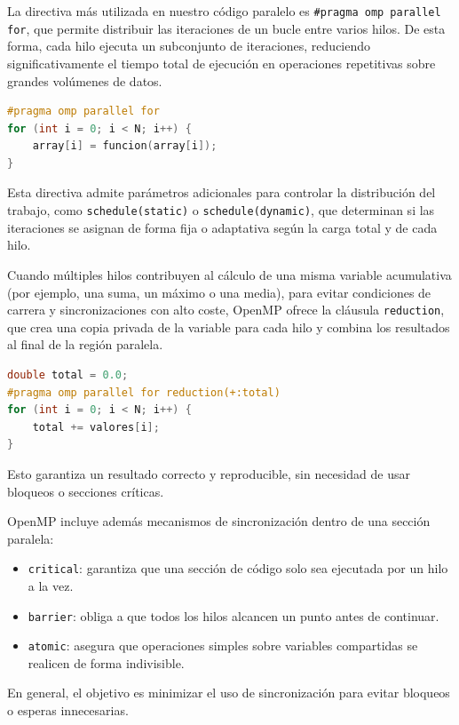 La directiva más utilizada en nuestro código paralelo es \texttt{\#pragma omp parallel for}, que permite distribuir las iteraciones de un bucle entre varios hilos.
De esta forma, cada hilo ejecuta un subconjunto de iteraciones, reduciendo significativamente el tiempo total de ejecución en operaciones repetitivas sobre grandes volúmenes de datos.

\begin{lstlisting}[language=C,label={lst:lstlisting2}]
#pragma omp parallel for
for (int i = 0; i < N; i++) {
    array[i] = funcion(array[i]);
}
\end{lstlisting}

Esta directiva admite parámetros adicionales para controlar la distribución del trabajo, como \texttt{schedule(static)} o \texttt{schedule(dynamic)}, que determinan si las iteraciones se asignan de forma fija o adaptativa según la carga total y de cada hilo.

Cuando múltiples hilos contribuyen al cálculo de una misma variable acumulativa (por ejemplo, una suma, un máximo o una media), para evitar condiciones de carrera y sincronizaciones con alto coste, OpenMP ofrece la cláusula \texttt{reduction}, que crea una copia privada de la variable para cada hilo y combina los resultados al final de la región paralela.

\begin{lstlisting}[language=C,label={lst:lstlisting}]
double total = 0.0;
#pragma omp parallel for reduction(+:total)
for (int i = 0; i < N; i++) {
    total += valores[i];
}
\end{lstlisting}

Esto garantiza un resultado correcto y reproducible, sin necesidad de usar bloqueos o secciones críticas.

OpenMP incluye además mecanismos de sincronización dentro de una sección paralela:
\begin{itemize}
    \item \texttt{critical}: garantiza que una sección de código solo sea ejecutada por un hilo a la vez.
    \item \texttt{barrier}: obliga a que todos los hilos alcancen un punto antes de continuar.
    \item \texttt{atomic}: asegura que operaciones simples sobre variables compartidas se realicen de forma indivisible.
\end{itemize}

En general, el objetivo es minimizar el uso de sincronización para evitar bloqueos o esperas innecesarias.

